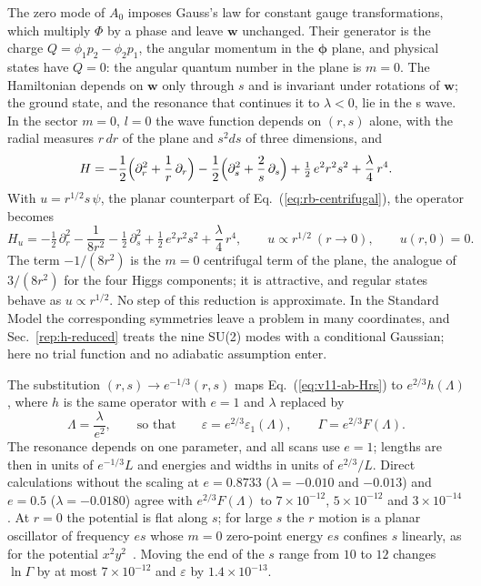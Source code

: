 The zero mode of $A_0$ imposes Gauss's law for constant gauge transformations, which multiply $\Phi$ by a phase and leave $\bm w$ unchanged.
Their generator is the charge $Q=\phi_1p_2-\phi_2p_1$, the angular momentum in the $\bm\phi$ plane, and physical states have $Q=0$: the angular quantum number in the plane is $m=0$.
The Hamiltonian depends on $\bm w$ only through $s$ and is invariant under rotations of $\bm w$; the ground state, and the resonance that continues it to $\lambda<0$, lie in the s wave.
In the sector $m=0$, $l=0$ the wave function depends on $(r,s)$ alone, with the radial measures $r\,dr$ of the plane and $s^2ds$ of three dimensions, and
\begin{equation}
H=-\frac12\Bigl(\partial_r^2+\frac1r\,\partial_r\Bigr)-\frac12\Bigl(\partial_s^2+\frac2s\,\partial_s\Bigr)+\tfrac12\,e^2r^2s^2+\frac\lambda4\,r^4 .
\label{eq:v11-ab-Hrs}
\end{equation}
With $u=r^{1/2}s\,\psi$, the planar counterpart of Eq.~(\ref{eq:rb-centrifugal}), the operator becomes
\begin{equation}
H_u=-\tfrac12\,\partial_r^2-\frac{1}{8r^2}-\tfrac12\,\partial_s^2+\tfrac12\,e^2r^2s^2+\frac\lambda4\,r^4,\qquad u\propto r^{1/2}\ (r\to0),\qquad u(r,0)=0 .
\label{eq:v11-ab-Hu}
\end{equation}
The term $-1/(8r^2)$ is the $m=0$ centrifugal term of the plane, the analogue of $3/(8r^2)$ for the four Higgs components; it is attractive, and regular states behave as $u\propto r^{1/2}$.
No step of this reduction is approximate.
In the Standard Model the corresponding symmetries leave a problem in many coordinates, and Sec.~\ref{rep:h-reduced} treats the nine SU(2) modes with a conditional Gaussian; here no trial function and no adiabatic assumption enter.

The substitution $(r,s)\to e^{-1/3}(r,s)$ maps Eq.~(\ref{eq:v11-ab-Hrs}) to $e^{2/3}h(\Lambda)$, where $h$ is the same operator with $e=1$ and $\lambda$ replaced by
\begin{equation}
\Lambda=\frac{\lambda}{e^2},\qquad\text{so that}\qquad \varepsilon=e^{2/3}\varepsilon_1(\Lambda),\qquad \Gamma=e^{2/3}F(\Lambda) .
\label{eq:v11-ab-scaling}
\end{equation}
The resonance depends on one parameter, and all scans use $e=1$; lengths are then in units of $e^{-1/3}L$ and energies and widths in units of $e^{2/3}/L$.
Direct calculations without the scaling at $e=0.8733$ ($\lambda=-0.010$ and $-0.013$) and $e=0.5$ ($\lambda=-0.0180$) agree with $e^{2/3}F(\Lambda)$ to $7\times10^{-12}$, $5\times10^{-12}$ and $3\times10^{-14}$. %
At $r=0$ the potential is flat along $s$; for large $s$ the $r$ motion is a planar oscillator of frequency $es$ whose $m=0$ zero-point energy $es$ confines $s$ linearly, as for the potential $x^2y^2$~\cite{Simon:1983jy}.
Moving the end of the $s$ range from $10$ to $12$ changes $\ln\Gamma$ by at most $7\times10^{-12}$ and $\varepsilon$ by $1.4\times10^{-13}$. %

